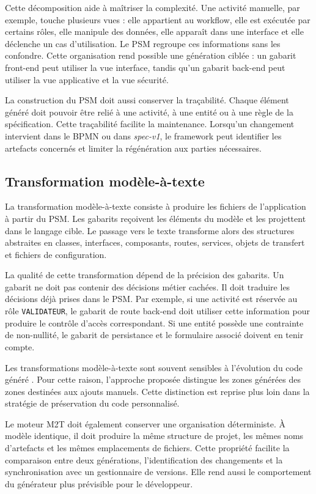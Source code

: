 Cette décomposition aide à maîtriser la complexité. Une activité manuelle, par exemple, touche plusieurs vues : elle appartient au workflow, elle est exécutée par certains rôles, elle manipule des données, elle apparaît dans une interface et elle déclenche un cas d'utilisation. Le PSM regroupe ces informations sans les confondre. Cette organisation rend possible une génération ciblée : un gabarit front-end peut utiliser la vue interface, tandis qu'un gabarit back-end peut utiliser la vue applicative et la vue sécurité.

La construction du PSM doit aussi conserver la traçabilité. Chaque élément généré doit pouvoir être relié à une activité, à une entité ou à une règle de la spécification. Cette traçabilité facilite la maintenance. Lorsqu'un changement intervient dans le BPMN ou dans \textit{spec-v1}, le framework peut identifier les artefacts concernés et limiter la régénération aux parties nécessaires.

\subsection{Transformation modèle-à-texte}

La transformation modèle-à-texte consiste à produire les fichiers de l'application à partir du PSM. Les gabarits reçoivent les éléments du modèle et les projettent dans le langage cible. Le passage vers le texte transforme alors des structures abstraites en classes, interfaces, composants, routes, services, objets de transfert et fichiers de configuration.

La qualité de cette transformation dépend de la précision des gabarits. Un gabarit ne doit pas contenir des décisions métier cachées. Il doit traduire les décisions déjà prises dans le PSM. Par exemple, si une activité est réservée au rôle \texttt{VALIDATEUR}, le gabarit de route back-end doit utiliser cette information pour produire le contrôle d'accès correspondant. Si une entité possède une contrainte de non-nullité, le gabarit de persistance et le formulaire associé doivent en tenir compte.

Les transformations modèle-à-texte sont souvent sensibles à l'évolution du code généré \cite{syriani2018}. Pour cette raison, l'approche proposée distingue les zones générées des zones destinées aux ajouts manuels. Cette distinction est reprise plus loin dans la stratégie de préservation du code personnalisé.

Le moteur M2T doit également conserver une organisation déterministe. À modèle identique, il doit produire la même structure de projet, les mêmes noms d'artefacts et les mêmes emplacements de fichiers. Cette propriété facilite la comparaison entre deux générations, l'identification des changements et la synchronisation avec un gestionnaire de versions. Elle rend aussi le comportement du générateur plus prévisible pour le développeur.

